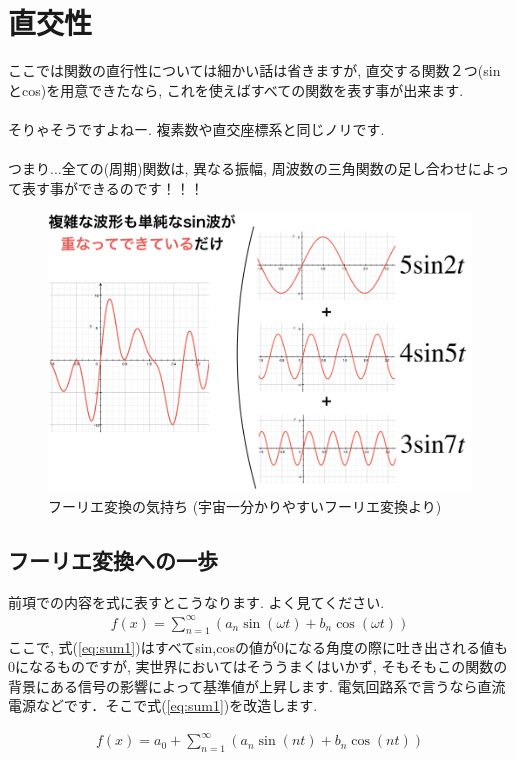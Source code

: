 \documentclass[11pt,a4paper,uplatex]{ujreport}
\begin{document}
\section{直交性}
ここでは関数の直行性については細かい話は省きますが, 直交する関数２つ(sinとcos)を用意できたなら, これを使えばすべての関数を表す事が出来ます.\\
\\
そりゃそうですよねー. 複素数や直交座標系と同じノリです.\\
\\
つまり...全ての(周期)関数は, 異なる振幅, 周波数の三角関数の足し合わせによって表す事ができるのです！！！\\

\begin{figure}[H]
\label{im:furier}
  \centering
  \includegraphics[width=120mm,bb=0 0 974 643]{../figures/furier.png}
  \caption{フーリエ変換の気持ち (宇宙一分かりやすいフーリエ変換より)}
\end{figure}

\subsection{フーリエ変換への一歩}
前項での内容を式に表すとこうなります. よく見てください.
\begin{eqnarray}
f(x) = \sum_{n=1}^\infty ({a_n \sin(\omega t) + b_n\cos(\omega t)}
\label{eq:sum1})
\end{eqnarray}
ここで, 式(\ref{eq:sum1})はすべてsin,cosの値が0になる角度の際に吐き出される値も0になるものですが, 実世界においてはそううまくはいかず, そもそもこの関数の背景にある信号の影響によって基準値が上昇します. 電気回路系で言うなら直流電源などです．そこで式(\ref{eq:sum1})を改造します.

\begin{eqnarray}
f(x) = a_0 + \sum_{n=1}^\infty ({a_n \sin(nt) + b_n\cos(nt)}
\label{eq:fixed_sum})
\end{eqnarray}
\end{document}
